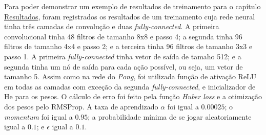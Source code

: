 Para poder demonstrar um exemplo de resultados de treinamento para o capítulo \hyperref[cap:resultados]{Resultados}, foram registrados os resultados de um treinamento cuja rede neural tinha três camadas de convolução e duas \textit{fully-connected}.
A primeira convolucional tinha 48 filtros de tamanho 8x8 e passo 4; a segunda tinha 96 filtros de tamanho 4x4 e passo 2; e a terceira tinha 96 filtros de tamanho 3x3 e passo 1.
A primeira \textit{fully-connected} tinha vetor de saída de tamaho 512; e a segunda tinha um nó de saída para cada ação possível, ou seja, um vetor de tamanho 5.
Assim como na rede do \textit{Pong}, foi utilizada função de ativação ReLU em todas as camadas com exceção da segunda \textit{fully-connected}, e inicializador de He para os pesos.
O cálculo de erro foi feito pela função \textit{Huber loss} e a otimização dos pesos pelo RMSProp.
A taxa de aprendizado $\alpha$ foi igual a $0.00025$; o \textit{momentum} foi igual a $0.95$; a probabilidade mínima de se jogar aleatoriamente igual a $0.1$; e $\epsilon$ igual a $0.1$.


